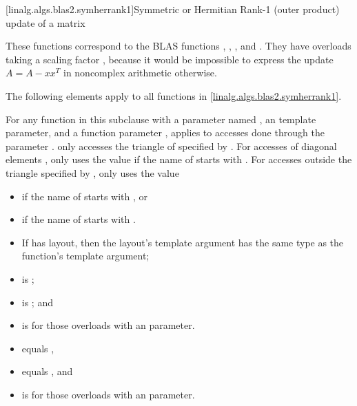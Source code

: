 [linalg.algs.blas2.symherrank1]{Symmetric or Hermitian Rank-1 (outer product) update of a matrix}

\pnum
\begin{note}
These functions correspond to the BLAS functions
, , , and \supercite{blas2}.
They have overloads taking a scaling factor ,
because it would be impossible to express the update
$A = A - x x^T$ in noncomplex arithmetic otherwise.
\end{note}

\pnum
The following elements apply to all functions in \ref{linalg.algs.blas2.symherrank1}.

\pnum
For any function  in this subclause with
a parameter named ,
an  template parameter, and
a function parameter ,
 applies to accesses done through the parameter .
 only accesses the triangle of  specified by .
For accesses of diagonal elements ,
 only uses the value 
if the name of  starts with .
For accesses  outside the triangle specified by ,
 only uses the value
\begin{itemize}
\item
{}
if the name of  starts with , or
\item
{}
if the name of  starts with .
\end{itemize}

\pnum
\mandates
\begin{itemize}
\item
If  has  layout,
then the layout's  template argument has
the same type as the function's  template argument;
\item
{}
is ;
\item
{}
is ; and
\item
{}
is  for those overloads with an  parameter.
\end{itemize}

\pnum
\expects
\begin{itemize}
\item
{} equals ,
\item
{} equals , and
\item
{} is 
for those overloads with an  parameter.
\end{itemize}

